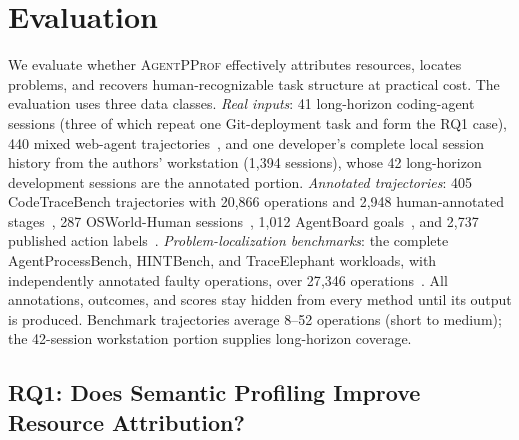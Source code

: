 \documentclass[sigconf,nonacm]{acmart}
\newcommand{\sys}{\textsc{AgentPProf}\xspace}
\begin{document}
\section{Evaluation}
\label{sec:eval}

We evaluate whether \sys effectively attributes resources, locates problems, and recovers human-recognizable task structure at practical cost. The evaluation uses three data classes.
\emph{Real inputs}: 41 long-horizon coding-agent sessions (three of which
repeat one Git-deployment task and form the RQ1 case), 440 mixed
web-agent trajectories~\cite{agentrewardbench}, and one developer's complete
local session history from the authors' workstation (1{,}394 sessions), whose
42 long-horizon development sessions are the annotated portion.
\emph{Annotated trajectories}: 405 CodeTraceBench trajectories with
20{,}866 operations and 2{,}948 human-annotated
stages~\cite{li2026codetracer}, 287 OSWorld-Human
sessions~\cite{osworldhuman}, 1{,}012 AgentBoard goals~\cite{agentboard},
and 2{,}737 published action
labels~\cite{bouzenia-pradel-2025-trajectories}.
\emph{Problem-localization benchmarks}: the complete AgentProcessBench,
HINTBench, and TraceElephant workloads, with independently annotated faulty
operations, over 27{,}346
operations~\cite{agentprocessbench,hintbench,traceelephant}.
All annotations, outcomes, and scores stay hidden from every method
until its output is produced.
Benchmark trajectories average 8--52 operations (short to medium); the 42-session workstation portion supplies long-horizon coverage.

\subsection{RQ1: Does Semantic Profiling Improve Resource Attribution?}
\end{document}
